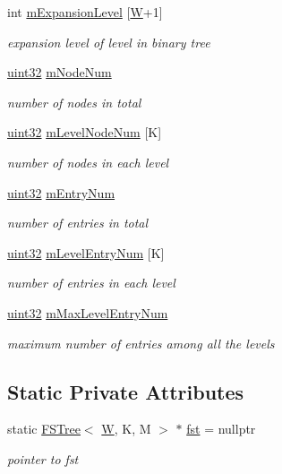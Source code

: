 \begin{DoxyCompactItemize}
int \hyperlink{classFSTree_aedbc7712ddc76989663e783d100464c6}{m\-Expansion\-Level} \mbox{[}\hyperlink{test__u128_8cpp_ab21b528bc38899d04d3a7053e52fb797}{W}+1\mbox{]}
\begin{DoxyCompactList}\small\item\em expansion level of level in binary tree \end{DoxyCompactList}\item 
\hyperlink{types_8h_abd01e8e67e3d94cab04ecaaf4f85ac1b}{uint32} \hyperlink{classFSTree_a0630cd4bcdd55f729691e762018f4951}{m\-Node\-Num}
\begin{DoxyCompactList}\small\item\em number of nodes in total \end{DoxyCompactList}\item 
\hyperlink{types_8h_abd01e8e67e3d94cab04ecaaf4f85ac1b}{uint32} \hyperlink{classFSTree_af525cc4431e3681403c81839e134efb7}{m\-Level\-Node\-Num} \mbox{[}K\mbox{]}
\begin{DoxyCompactList}\small\item\em number of nodes in each level \end{DoxyCompactList}\item 
\hyperlink{types_8h_abd01e8e67e3d94cab04ecaaf4f85ac1b}{uint32} \hyperlink{classFSTree_a8c62509827ce3ebeb3f717baedd43089}{m\-Entry\-Num}
\begin{DoxyCompactList}\small\item\em number of entries in total \end{DoxyCompactList}\item 
\hyperlink{types_8h_abd01e8e67e3d94cab04ecaaf4f85ac1b}{uint32} \hyperlink{classFSTree_a0632c6cc8f80db743e022cf67095bf3f}{m\-Level\-Entry\-Num} \mbox{[}K\mbox{]}
\begin{DoxyCompactList}\small\item\em number of entries in each level \end{DoxyCompactList}\item 
\hyperlink{types_8h_abd01e8e67e3d94cab04ecaaf4f85ac1b}{uint32} \hyperlink{classFSTree_ac274e7459a6129f7497bac0807dbfbb7}{m\-Max\-Level\-Entry\-Num}
\begin{DoxyCompactList}\small\item\em maximum number of entries among all the levels \end{DoxyCompactList}\end{DoxyCompactItemize}
\subsection*{Static Private Attributes}
\begin{DoxyCompactItemize}
\item 
static \hyperlink{classFSTree}{F\-S\-Tree}$<$ \hyperlink{test__u128_8cpp_ab21b528bc38899d04d3a7053e52fb797}{W}, K, M $>$ $\ast$ \hyperlink{classFSTree_a9bb6d9cad646464a0467038c9d37b407}{fst} = nullptr
\begin{DoxyCompactList}\small\item\em pointer to fst \end{DoxyCompactList}\end{DoxyCompactItemize}


